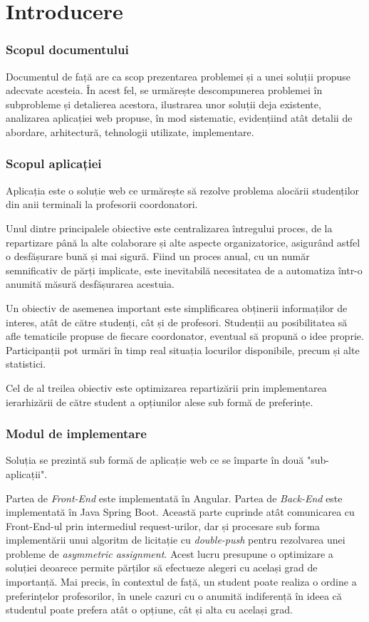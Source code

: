 \chapter*{Introducere} 

\subsection{Scopul documentului}
Documentul de față are ca scop prezentarea problemei și a unei soluții propuse adecvate acesteia. În acest fel, se urmărește descompunerea problemei în subprobleme și detalierea acestora, ilustrarea unor soluții deja existente, analizarea aplicației web propuse, în mod sistematic, evidențiind atât detalii de abordare, arhitectură, tehnologii utilizate, implementare.

\subsection{Scopul aplicației}
Aplicația \textit{\thesistitle{}} este o soluție web ce urmărește să rezolve problema alocării studenților din anii terminali la profesorii coordonatori.

Unul dintre principalele obiective este centralizarea întregului proces, de la repartizare până la alte colaborare și alte aspecte organizatorice, asigurând astfel o desfășurare bună și mai sigură. Fiind un proces anual, cu un număr semnificativ de părți implicate, este inevitabilă necesitatea de a automatiza într-o anumită măsură desfășurarea acestuia.

Un obiectiv de asemenea important este simplificarea obținerii informaților de interes, atât de către studenți, cât și de profesori. Studenții au posibilitatea să afle tematicile propuse de fiecare coordonator, eventual să propună o idee proprie. Participanții pot urmări în timp real situația locurilor disponibile, precum și alte statistici.

Cel de al treilea obiectiv este optimizarea repartizării prin implementarea ierarhizării de către student a opțiunilor alese sub formă de preferințe.

\subsection{Modul de implementare}
Soluția se prezintă sub formă de aplicație web ce se împarte în două "sub-aplicații".

Partea de \textit{Front-End} este implementată în Angular.
Partea de \textit{Back-End} este implementată în Java Spring Boot. Această parte cuprinde atât comunicarea cu Front-End-ul prin intermediul request-urilor, dar și procesare sub forma implementării unui algoritm de licitație cu \textit{double-push} pentru rezolvarea unei probleme de \textit{asymmetric assignment}. Acest lucru presupune o optimizare a soluției deoarece permite părților să efectueze alegeri cu același grad de importanță. Mai precis, în contextul de față, un student poate realiza o ordine a preferințelor profesorilor, în unele cazuri cu o anumită indiferență în ideea că studentul poate prefera atât o opțiune, cât și alta cu același grad.